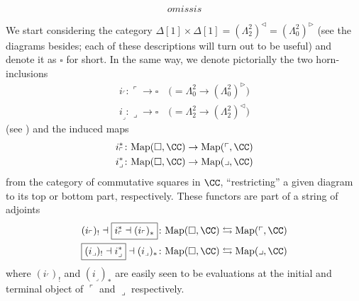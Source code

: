 \hrulefill


\[
omissis
\]

\hrulefill

We start considering the category $\Delta[1]\times\Delta[1] =  (\Lambda_2^2)^\lhd = (\Lambda_0^2)^\rhd$ (see the diagrams besides;  
each of these descriptions will turn out to be useful) and denote it as $\square$ for short. In the same way, we denote pictorially the two horn-inclusions
\begin{gather*}
i_\ulcorner\colon \ulcorner\to \square \quad \big(= \Lambda_0^2\to (\Lambda_0^2)^\rhd\big)\\
i_\lrcorner\colon \lrcorner\to \square \quad \big(= \Lambda_2^2\to (\Lambda_2^2)^\lhd\big)
\end{gather*}
(see \cite[Notation \textbf{1.2.8.4}]{HTT}) and the induced maps
\begin{gather}
i_\ulcorner^*\colon \text{Map}(\square, \CC) \to \text{Map}(\ulcorner,\CC)\\
i_\lrcorner^*\colon \text{Map}(\square, \CC) \to \text{Map}(\lrcorner,\CC)
\end{gather}
from the category of commutative squares in $\CC$, ``restricting'' a given diagram to its top or bottom part, respectively. These functors are part of a string of adjoints
\begin{gather}
(i_\ulcorner)_! \dashv \boxed{i_\ulcorner^* \dashv (i_\ulcorner)_*}\colon \text{Map}(\square,\CC)\leftrightarrows \text{Map}(\ulcorner,\CC)\\
\boxed{(i_\lrcorner)_! \dashv i_\lrcorner^*} \dashv (i_\lrcorner)_*\colon \text{Map}(\square,\CC)\leftrightarrows \text{Map}(\lrcorner,\CC)
\end{gather}
where $(i_\ulcorner)_!$ and $(i_\lrcorner)_*$ are easily seen to be evaluations at the initial and terminal object of $\ulcorner$ and $\lrcorner$ respectively. 

